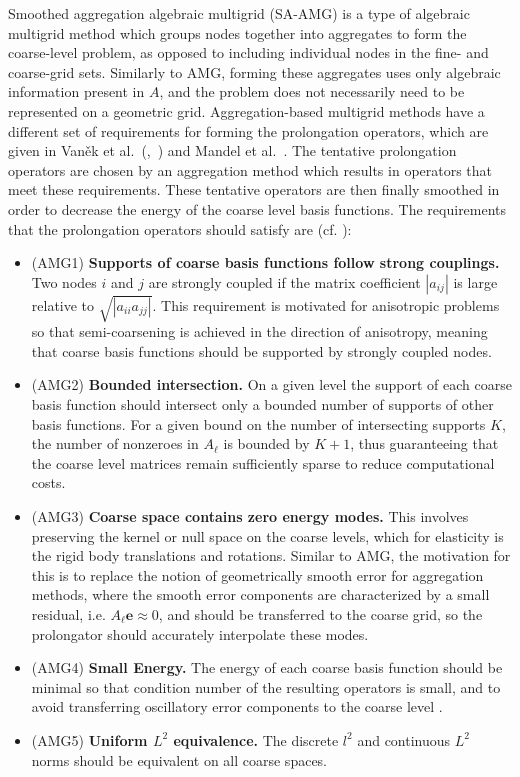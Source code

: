 Smoothed aggregation algebraic multigrid (SA-AMG) is a type of algebraic multigrid method which groups nodes together into aggregates to form the coarse-level problem, as opposed to including individual nodes in the fine- and coarse-grid sets. Similarly to AMG, forming these aggregates uses only algebraic information present in $A$, and the problem does not necessarily need to be represented on a geometric grid. Aggregation-based multigrid methods have a different set of requirements for forming the prolongation operators, which are given in Van\v{e}k et al.~(\cite{Vanek1996},~\cite{Vanek1996_unstruc}) and Mandel et al.~\cite{Mandel1999}. The tentative prolongation operators are chosen by an aggregation method which results in operators that meet these requirements. These tentative operators are then finally smoothed in order to decrease the energy of the coarse level basis functions. The requirements that the prolongation operators should satisfy are (cf. \cite{Vanek1996_unstruc}):

\begin{itemize}
	\item (AMG1) \textbf{Supports of coarse basis functions follow strong couplings.} Two nodes $i$ and $j$ are strongly coupled if the matrix coefficient $|a_{ij}|$ is large relative to $\sqrt{|a_{ii}a_{jj}|}$. This requirement is motivated for anisotropic problems so that semi-coarsening is achieved in the direction of anisotropy, meaning that coarse basis functions should be supported by strongly coupled nodes.
	\item (AMG2) \textbf{Bounded intersection.} On a given level the support of each coarse basis function should intersect only a bounded number of supports of other basis functions. For a given bound on the number of intersecting supports $K$, the number of nonzeroes in $A_\ell$ is bounded by $K+1$, thus guaranteeing that the coarse level matrices remain sufficiently sparse to reduce computational costs.
	\item (AMG3) \textbf{Coarse space contains zero energy modes.} This involves preserving the kernel or null space on the coarse levels, which for elasticity is the rigid body translations and rotations. Similar to AMG, the motivation for this is to replace the notion of geometrically smooth error for aggregation methods, where the smooth error components are characterized by a small residual, i.e. $A_\ell\mathbf{e} \approx 0$, and should be transferred to the coarse grid, so the prolongator should accurately interpolate these modes.
	\item (AMG4) \textbf{Small Energy.} The energy of each coarse basis function should be minimal so that condition number of the resulting operators is small, and to avoid transferring oscillatory error components to the coarse level \cite{Mandel1999}.
	\item (AMG5) \textbf{Uniform $L^2$ equivalence.} The discrete $l^2$ and continuous $L^2$ norms should be equivalent on all coarse spaces.
\end{itemize}

